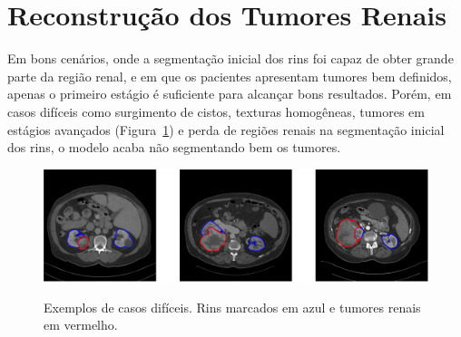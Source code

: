 \section{Reconstrução dos Tumores Renais}
\label{sec:metodo-reconstrucao-dos-tumores-renais}


Em bons cenários, onde a segmentação inicial dos rins foi capaz de obter grande parte da região renal, e em que os pacientes apresentam tumores bem definidos, apenas o primeiro estágio é suficiente para alcançar bons resultados. Porém, em casos difíceis como surgimento de cistos, texturas homogêneas, tumores em estágios avançados (Figura~\ref{fig:casos-dificeis}) e perda de regiões renais na segmentação inicial dos rins, o modelo acaba não segmentando bem os tumores.

\begin{figure}[!ht]
    \centering
    \caption{Exemplos de casos difíceis. Rins marcados em azul e tumores renais em vermelho.}
    \includegraphics[width=1\textwidth]{figuras/casos-dificeis.pdf}
    \label{fig:casos-dificeis}
\end{figure}


